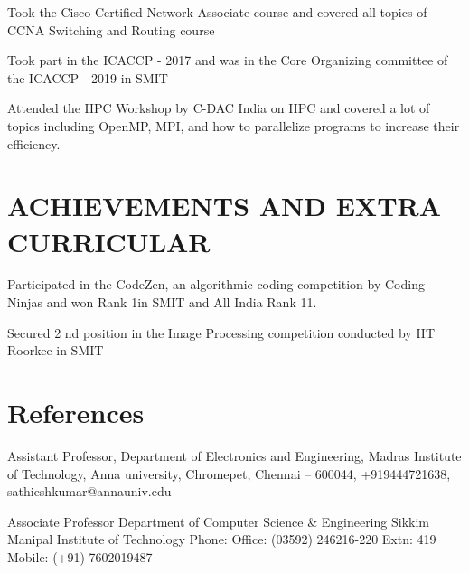 \documentclass[]{imman_resume}
\begin{document}
\begin{minipage}[t]{1\textwidth}
Took the Cisco Certified Network Associate course and covered all topics of CCNA Switching and Routing course
\sectionsep


Took part in the ICACCP - 2017 and was in the Core Organizing committee of the ICACCP - 2019 in SMIT
\sectionsep


Attended the HPC Workshop by C-DAC India on HPC and covered a lot of topics including OpenMP, MPI, and how to
parallelize programs to increase their efficiency.
\sectionsep

\section{ACHIEVEMENTS AND EXTRA CURRICULAR}

Participated in the CodeZen, an algorithmic coding competition by Coding Ninjas and won Rank 1in SMIT and All India
Rank 11.
\sectionsep


Secured 2 nd position in the Image Processing competition conducted by IIT Roorkee in SMIT 
\sectionsep

\section{References}

Assistant Professor, Department of Electronics and Engineering, Madras Institute of Technology, Anna university, Chromepet, Chennai – 600044, +919444721638, sathieshkumar@annauniv.edu
\sectionsep


Associate Professor
Department of Computer Science & Engineering
Sikkim Manipal Institute of Technology
Phone: Office: (03592) 246216-220 Extn: 419
           Mobile: (+91) 7602019487
\sectionsep
\end{minipage}
\end{document}
